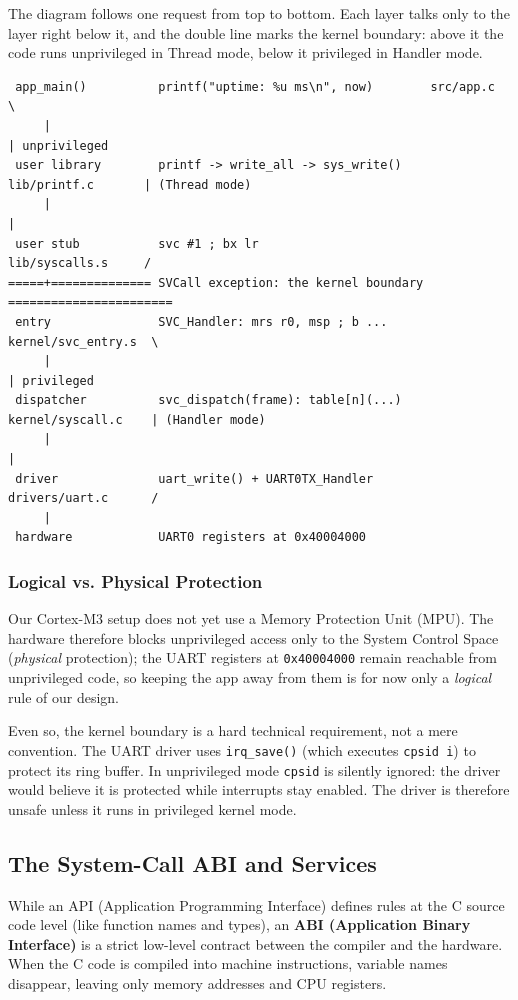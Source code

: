 The diagram follows one request from top to bottom. Each layer talks only to the layer right below it, and the double line marks the kernel boundary: above it the code runs unprivileged in Thread mode, below it privileged in Handler mode.

\begin{verbatim}
 app_main()          printf("uptime: %u ms\n", now)        src/app.c          \
     |                                                                         | unprivileged
 user library        printf -> write_all -> sys_write()    lib/printf.c       | (Thread mode)
     |                                                                         |
 user stub           svc #1 ; bx lr                        lib/syscalls.s     /
=====+============== SVCall exception: the kernel boundary =======================
 entry               SVC_Handler: mrs r0, msp ; b ...      kernel/svc_entry.s  \
     |                                                                          | privileged
 dispatcher          svc_dispatch(frame): table[n](...)    kernel/syscall.c    | (Handler mode)
     |                                                                          |
 driver              uart_write() + UART0TX_Handler        drivers/uart.c      /
     |
 hardware            UART0 registers at 0x40004000
\end{verbatim}

\subsubsection{Logical vs. Physical Protection}
Our Cortex-M3 setup does not yet use a Memory Protection Unit (MPU). The hardware therefore blocks unprivileged access only to the System Control Space (\textit{physical} protection); the UART registers at \texttt{0x40004000} remain reachable from unprivileged code, so keeping the app away from them is for now only a \textit{logical} rule of our design.

Even so, the kernel boundary is a hard technical requirement, not a mere convention. The UART driver uses \texttt{irq\_save()} (which executes \texttt{cpsid i}) to protect its ring buffer. In unprivileged mode \texttt{cpsid} is silently ignored: the driver would believe it is protected while interrupts stay enabled. The driver is therefore unsafe unless it runs in privileged kernel mode.

\subsection{The System-Call ABI and Services}
While an API (Application Programming Interface) defines rules at the C source code level (like function names and types), an \textbf{ABI (Application Binary Interface)} is a strict low-level contract between the compiler and the hardware. When the C code is compiled into machine instructions, variable names disappear, leaving only memory addresses and CPU registers. 

